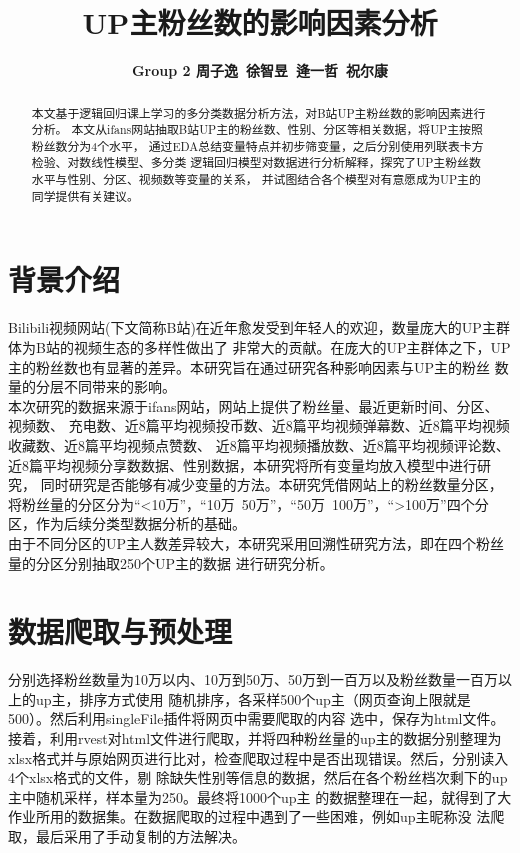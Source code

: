 \documentclass{ctexart}
\title{\textbf{UP主粉丝数的影响因素分析}}
\author{\textbf{Group 2 周子逸\ 徐智昱\ 逄一哲\ 祝尔康}}
\date{}
\begin{document}
\maketitle
\begin{abstract}
    本文基于逻辑回归课上学习的多分类数据分析方法，对B站UP主粉丝数的影响因素进行分析。
本文从ifans网站抽取B站UP主的粉丝数、性别、分区等相关数据，将UP主按照粉丝数分为4个水平，
通过EDA总结变量特点并初步筛变量，之后分别使用列联表卡方检验、对数线性模型、多分类
逻辑回归模型对数据进行分析解释，探究了UP主粉丝数水平与性别、分区、视频数等变量的关系，
并试图结合各个模型对有意愿成为UP主的同学提供有关建议。
\end{abstract}
\tableofcontents
\newpage
\section{背景介绍}
Bilibili视频网站(下文简称B站)在近年愈发受到年轻人的欢迎，数量庞大的UP主群体为B站的视频生态的多样性做出了
非常大的贡献。在庞大的UP主群体之下，UP主的粉丝数也有显著的差异。本研究旨在通过研究各种影响因素与UP主的粉丝
数量的分层不同带来的影响。\\
\indent 本次研究的数据来源于ifans网站，网站上提供了粉丝量、最近更新时间、分区、视频数、
充电数、近8篇平均视频投币数、近8篇平均视频弹幕数、近8篇平均视频收藏数、近8篇平均视频点赞数、
近8篇平均视频播放数、近8篇平均视频评论数、近8篇平均视频分享数数据、性别数据，本研究将所有变量均放入模型中进行研究，
同时研究是否能够有减少变量的方法。本研究凭借网站上的粉丝数量分区，
将粉丝量的分区分为“<10万”，“10万~50万”，“50万~100万”，“>100万”四个分区，作为后续分类型数据分析的基础。\\
\indent 由于不同分区的UP主人数差异较大，本研究采用回溯性研究方法，即在四个粉丝量的分区分别抽取250个UP主的数据
进行研究分析。

\section{数据爬取与预处理}

分别选择粉丝数量为10万以内、10万到50万、50万到一百万以及粉丝数量一百万以上的up主，排序方式使用
随机排序，各采样500个up主（网页查询上限就是500）。然后利用singleFile插件将网页中需要爬取的内容
选中，保存为html文件。接着，利用rvest对html文件进行爬取，并将四种粉丝量的up主的数据分别整理为
xlsx格式并与原始网页进行比对，检查爬取过程中是否出现错误。然后，分别读入4个xlsx格式的文件，剔
除缺失性别等信息的数据，然后在各个粉丝档次剩下的up主中随机采样，样本量为250。最终将1000个up主
的数据整理在一起，就得到了大作业所用的数据集。在数据爬取的过程中遇到了一些困难，例如up主昵称没
法爬取，最后采用了手动复制的方法解决。
\end{document}
